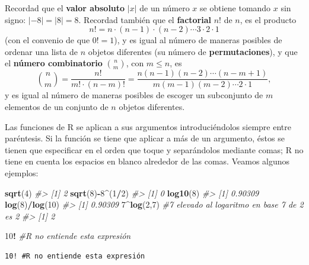 \documentclass[
]{book}
\newenvironment{Shaded}{\begin{snugshade}}{\end{snugshade}}
\newcommand{\CommentTok}[1]{\textcolor[rgb]{0.56,0.35,0.01}{\textit{#1}}}
\newcommand{\DecValTok}[1]{\textcolor[rgb]{0.00,0.00,0.81}{#1}}
\newcommand{\KeywordTok}[1]{\textcolor[rgb]{0.13,0.29,0.53}{\textbf{#1}}}
\newcommand{\NormalTok}[1]{#1}
\newcommand{\OperatorTok}[1]{\textcolor[rgb]{0.81,0.36,0.00}{\textbf{#1}}}
\newcommand{\StringTok}[1]{\textcolor[rgb]{0.31,0.60,0.02}{#1}}
\theoremstyle{definition}
\theoremstyle{definition}
\theoremstyle{definition}
\theoremstyle{remark}
\begin{document}
Recordad que el \textbf{valor absoluto} \(|x|\) de un número \(x\) se obtiene tomando \(x\) sin signo: \(|-8|=|8|=8\). Recordad también que el \textbf{factorial} \(n!\) de \(n\), es el producto
\[
n!=n\cdot (n-1)\cdot (n-2) \cdots 3\cdot 2 \cdot 1
\]
(con el convenio de que \(0!=1\)), y es igual al número de maneras posibles de ordenar una lista de \(n\) objetos diferentes (su número de \textbf{permutaciones}),
y que el \textbf{número combinatorio} \(\binom{n}{m}\), con \(m\leqslant n\), es
\[
\binom{n}{m}=\frac{n!}{m!\cdot (n-m)!}=\frac{n(n-1)(n-2)\cdots (n-m+1)}{m(m-1)(m-2)\cdots 2\cdot 1},
\]
y es igual al número de maneras posibles de escoger un subconjunto de \(m\) elementos de un conjunto de \(n\) objetos diferentes.

Las funciones de R se aplican a sus argumentos introduciéndolos siempre entre paréntesis. Si la función se tiene que aplicar a más de un argumento, éstos se tienen que especificar en el orden que toque y separándolos mediante comas; R no tiene en cuenta los espacios en blanco alrededor de las comas. Veamos algunos ejemplos:

\begin{Shaded}
\begin{Highlighting}[]
\KeywordTok{sqrt}\NormalTok{(}\DecValTok{4}\NormalTok{)}
\CommentTok{\#\textgreater{} [1] 2}
\KeywordTok{sqrt}\NormalTok{(}\DecValTok{8}\NormalTok{)}\OperatorTok{{-}}\DecValTok{8}\OperatorTok{\^{}}\NormalTok{(}\DecValTok{1}\OperatorTok{/}\DecValTok{2}\NormalTok{)}
\CommentTok{\#\textgreater{} [1] 0}
\KeywordTok{log10}\NormalTok{(}\DecValTok{8}\NormalTok{)}
\CommentTok{\#\textgreater{} [1] 0.90309}
\KeywordTok{log}\NormalTok{(}\DecValTok{8}\NormalTok{)}\OperatorTok{/}\KeywordTok{log}\NormalTok{(}\DecValTok{10}\NormalTok{)}
\CommentTok{\#\textgreater{} [1] 0.90309}
\DecValTok{7}\OperatorTok{\^{}}\KeywordTok{log}\NormalTok{(}\DecValTok{2}\NormalTok{,}\DecValTok{7}\NormalTok{) }\CommentTok{\#7 elevado al logaritmo en base 7 de 2 es 2}
\CommentTok{\#\textgreater{} [1] 2}
\end{Highlighting}
\end{Shaded}

\begin{Shaded}
\begin{Highlighting}[]
\DecValTok{10}\OperatorTok{!}\StringTok{ }\CommentTok{\#R no entiende esta expresión}
\end{Highlighting}
\end{Shaded}

\begin{verbatim}
10! #R no entiende esta expresión
\end{verbatim}
\end{document}
